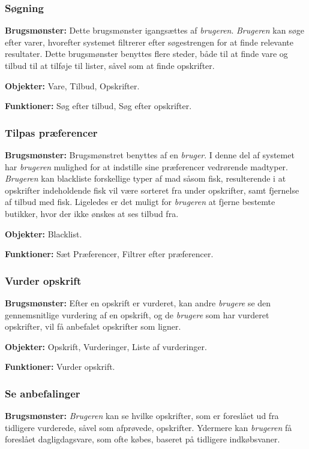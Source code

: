\subsubsection*{Søgning}
\textbf{Brugsmønster:} Dette brugsmønster igangsættes af \textit{brugeren}.
\textit{Brugeren} kan søge efter varer, hvorefter systemet filtrerer efter søgestrengen for at finde relevante resultater.
Dette brugsmønster benyttes flere steder, både til at finde vare og tilbud til at tilføje til lister, såvel som at finde opskrifter.


\textbf{Objekter:} Vare, Tilbud, Opskrifter.

\textbf{Funktioner:} Søg efter tilbud, Søg efter opskrifter.

\subsubsection*{Tilpas præferencer}
\textbf{Brugsmønster:} Brugsmønstret benyttes af en \textit{bruger}.
I denne del af systemet har \textit{brugeren} mulighed for at indstille sine præferencer vedrørende madtyper.
\textit{Brugeren} kan blackliste forskellige typer af mad såsom fisk, resulterende i at opskrifter indeholdende fisk vil være sorteret fra under opskrifter, samt fjernelse af tilbud med fisk. 
Ligeledes er det muligt for \textit{brugeren} at fjerne bestemte butikker, hvor der ikke ønskes at ses tilbud fra.

\textbf{Objekter:} Blacklist.

\textbf{Funktioner:} Sæt Præferencer, Filtrer efter præferencer.

\subsubsection*{Vurder opskrift}
\textbf{Brugsmønster:} 
Efter en opskrift er vurderet, kan andre \textit{brugere} se den gennemsnitlige vurdering af en opskrift, og de \textit{brugere} som har vurderet opskrifter, vil få anbefalet opskrifter som ligner.

\textbf{Objekter:} Opskrift, Vurderinger, Liste af vurderinger.

\textbf{Funktioner:} Vurder opskrift.

\subsubsection*{Se anbefalinger}
\textbf{Brugsmønster:} \textit{Brugeren} kan se hvilke opskrifter, som er foreslået ud fra tidligere vurderede, såvel som afprøvede, opskrifter.
Ydermere kan \textit{brugeren} få foreslået dagligdagsvare, som ofte købes, baseret på tidligere indkøbsvaner.

